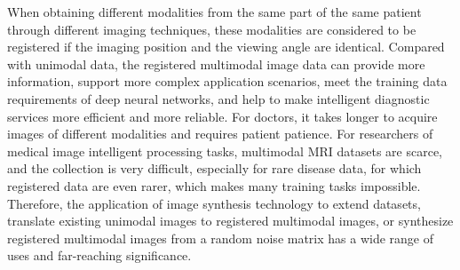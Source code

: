 \documentclass[runningheads]{llncs}
\begin{document}
When obtaining different modalities from the same part of the same patient through different imaging techniques, these modalities are considered to be registered if the imaging position and the viewing angle are identical. Compared with unimodal data, the registered multimodal image data can provide more information, support more complex application scenarios, meet the training data requirements of deep neural networks, and help to make intelligent diagnostic services more efficient and more reliable. For doctors, it takes longer to acquire images of different modalities and requires patient patience. For researchers of medical image intelligent processing tasks, multimodal MRI datasets are scarce, and the collection is very difficult, especially for rare disease data, for which registered data are even rarer, which makes many training tasks impossible. Therefore, the application of image synthesis technology to extend datasets, translate existing unimodal images to registered multimodal images, or synthesize registered multimodal images from a random noise matrix has a wide range of uses and far-reaching significance.
\end{document}
